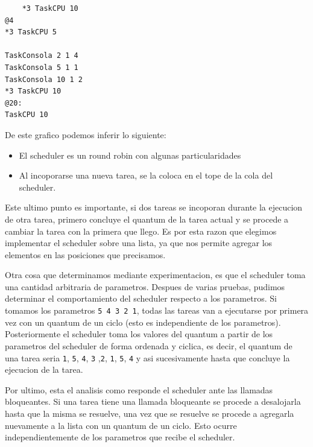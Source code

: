 \begin{lstlisting}
	*3 TaskCPU 10
@4
*3 TaskCPU 5

TaskConsola 2 1 4
TaskConsola 5 1 1
TaskConsola 10 1 2
*3 TaskCPU 10
@20:
TaskCPU 10
\end{lstlisting}

De este grafico podemos inferir lo siguiente:

\begin{itemize}
	\item El scheduler es un round robin con algunas particularidades
	\item Al incoporarse una nueva tarea, se la coloca en el tope de la cola del scheduler.
\end{itemize}

Este ultimo punto es importante, si dos tareas se incoporan durante la ejecucion de otra tarea, primero concluye el quantum de la tarea actual y se procede a cambiar la tarea con la primera que llego. Es por esta razon que elegimos implementar el scheduler sobre una lista, ya que nos permite agregar los elementos en las posiciones que precisamos.

Otra cosa que determinamos mediante experimentacion, es que el scheduler toma una cantidad arbitraria de parametros. Despues de varias pruebas, pudimos determinar el comportamiento del scheduler respecto a los parametros. Si tomamos los parametros \texttt{5 4 3 2 1}, todas las tareas van a ejecutarse por primera vez con un quantum de un ciclo (esto es independiente de los parametros). Posteriormente el scheduler toma los valores del quantum a partir de los parametros del scheduler de forma ordenada y ciclica, es decir, el quantum de una tarea seria \texttt{1}, \texttt{5}, \texttt{4}, \texttt{3} ,\texttt{2}, \texttt{1}, \texttt{5}, \texttt{4} y asi sucesivamente hasta que concluye la ejecucion de la tarea.

Por ultimo, esta el analisis como responde el scheduler ante las llamadas bloqueantes. Si una tarea tiene una llamada bloqueante se procede a desalojarla hasta que la misma se resuelve, una vez que se resuelve se procede a agregarla nuevamente a la lista con un quantum de un ciclo. Esto ocurre independientemente de los parametros que recibe el scheduler.